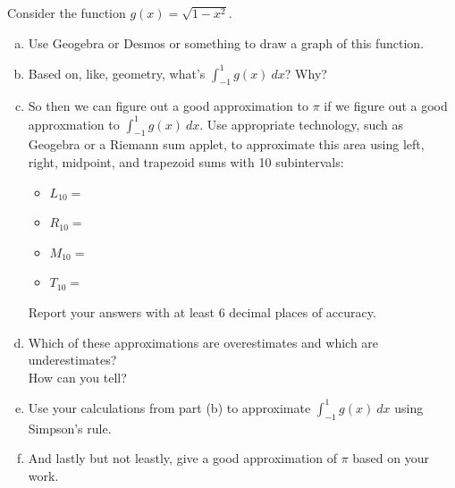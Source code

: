 \hrulefill

Consider the function \(g(x)=\sqrt{1-x^2}\). 

\begin{enumerate}[(a)]
  \item Use Geogebra or Desmos or something to draw a graph of this function.
  \item Based on, like, geometry, what's \(\displaystyle\int_{-1}^1 g(x)\ dx\)? Why?
  \vfill

  \item So then we can figure out a good approximation to \(\pi\) if we figure out a good approxmation to \(\int_{-1}^1 g(x)\ dx\). Use appropriate technology, such as Geogebra or a Riemann sum applet, to approximate this area using left, right, midpoint, and trapezoid sums with 10 subintervals:
  \begin{itemize}
    \item $L_{10}=$
    \item $R_{10}=$
    \item $M_{10}=$
    \item $T_{10}=$
  \end{itemize}
  Report your answers with at least 6 decimal places of accuracy.
  
  \item Which of these approximations are overestimates and which are underestimates? \\
  How can you tell?
  \vfill

  \item Use your calculations from part (b) to approximate \(\displaystyle\int_{-1}^1 g(x)\ dx\) using Simpson's rule.

  \vfill
  \item And lastly but not leastly, give a good approximation of \(\pi\) based on your work.
\end{enumerate}

